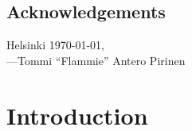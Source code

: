\documentclass[officiallayout,draft]{unihelcompling}
\begin{document}
\section*{Acknowledgements}
\label{sec:acknowledgements}

Helsinki \today,\\
---Tommi ``Flammie'' Antero Pirinen

\chapter{Introduction}
\label{chap:introduction}
\end{document}
